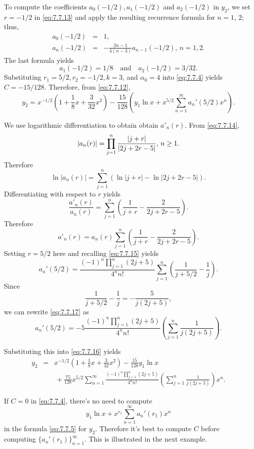\documentclass{ximera}
\begin{document}
\begin{example}
\begin{explanation}
To compute the coefficients $a_0(-1/2),a_1(-1/2)$ and $a_2(-1/2)$ in
$y_2$,
we set $r=-1/2$ in \eqref{eq:7.7.13} and apply the resulting recurrence
formula for $n=1$, $2$;   thus,
\begin{eqnarray*}
a_0(-1/2)&=&1,\\
a_n(-1/2)&=&-\frac{2n-1}{4(n-3)}a_{n-1}(-1/2),\,n=1,2.
\end{eqnarray*}
The last formula  yields
$$
a_1(-1/2)=1/8 \quad\mbox{and}\quad a_2(-1/2)=3/32.
$$
Substituting $r_1=5/2,r_2=-1/2,k=3$, and $\alpha_0=4$ into
 \eqref{eq:7.7.4} yields $C=-15/128$.  Therefore, from
\eqref{eq:7.7.12},
\begin{equation} \label{eq:7.7.16}
y_2=x^{-1/2}\left(1+\frac{1}{8}x+\frac{3}{32}x^2\right)
-\frac{15}{128}
\left(y_1\ln x+x^{5/2}\sum_{n=1}^\infty a_n'(5/2)x^n\right).
\end{equation}

We use logarithmic differentiation to obtain
 obtain $a'_n(r)$. From
\eqref{eq:7.7.14},
$$
|a_n(r)|=\prod_{j=1}^n{|j+r|\over|2j+2r-5|},\,n\geq 1.
$$
Therefore
$$
\ln |a_n(r)|=\sum^n_{j=1} \left(\ln |j+r|-\ln|2j+2r-5|\right).
$$
Differentiating  with respect to $r$ yields
$$
\frac{a'_n(r)}{a_n(r)}=\sum^n_{j=1} \left(\frac{1}{j+r}-\frac{2}{2j+2r-5}\right).
$$
Therefore
$$
a'_n(r)=a_n(r) \sum^n_{j=1} \left(\frac{1}{j+r}-\frac{2}{2j+2r-5}\right).
$$
Setting $r=5/2$ here and recalling \eqref{eq:7.7.15} yields
\begin{equation} \label{eq:7.7.17}
a_n'(5/2)=\frac{(-1)^n\prod_{j=1}^n(2j+5)}{4^nn!}\sum_{j=1}^n
\left(\frac{1}{j+5/2}-\frac{1}{j}\right).
\end{equation}
Since
$$
\frac{1}{j+5/2}-\frac{1}{j}=-\frac{5}{j(2j+5)},
$$
we can rewrite \eqref{eq:7.7.17} as
$$
a_n'(5/2)=-5\frac{(-1)^n\prod_{j=1}^n(2j+5)}{4^nn!}
\left(\sum_{j=1}^n\frac{1}{j(2j+5)}\right).
$$

Substituting this into \eqref{eq:7.7.16} yields
\begin{eqnarray*}
y_2&=&x^{-1/2}\left(1+\frac{1}{8}x+\frac{3}{32}x^2\right)-\frac{15}{128}
y_1\ln x\\
&&\,+\frac{75}{128}
x^{5/2}\sum_{n=1}^\infty
\frac{(-1)^n\prod_{j=1}^n(2j+5)}{4^nn!}
\left(\sum_{j=1}^n\frac{1}{j(2j+5)}\right)x^n.
\end{eqnarray*}

\end{explanation}
\end{example}

If $C=0$ in \eqref{eq:7.7.4}, there's no need to compute
$$
y_1\ln x+x^{r_1}\sum_{n=1}^\infty a_n'(r_1)x^n
$$
in the formula \eqref{eq:7.7.5} for $y_2$. Therefore it's best to
compute $C$  before computing $\{a_n'(r_1)\}_{n=1}^\infty$.
This is illustrated  in the next example. 
\end{document}
